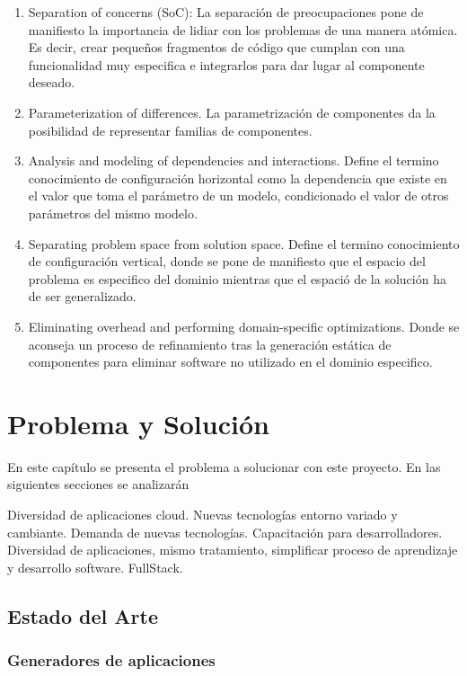 \documentclass[a4paper,11pt]{book}
\begin{document}
\begin{enumerate}
\item Separation of concerns (SoC): La separación de preocupaciones pone de manifiesto la importancia de lidiar con los problemas de una manera atómica. Es decir, crear pequeños fragmentos de código que cumplan con una funcionalidad muy especifica e integrarlos para dar lugar al componente deseado. 
\item Parameterization of differences. La parametrización de componentes da la posibilidad de representar familias de componentes. 
\item Analysis and modeling of dependencies and interactions. Define el termino conocimiento de configuración horizontal como la dependencia que existe en el valor que toma el parámetro de un modelo, condicionado el valor de otros parámetros del mismo modelo.  
\item Separating problem space from solution space. Define el termino conocimiento de configuración vertical, donde se pone de manifiesto que el espacio del problema es especifico del dominio mientras que el espació de la solución ha de ser generalizado.  
\item Eliminating overhead and performing domain-specific optimizations. Donde se aconseja un proceso de refinamiento tras la generación estática de componentes para eliminar software no utilizado en el dominio especifico. 
\end{enumerate}



\chapter{Problema y Solución}

En este capítulo se presenta el problema a solucionar con este proyecto. En las siguientes secciones se analizarán 


Diversidad de aplicaciones cloud. Nuevas tecnologías entorno variado y cambiante. Demanda de nuevas tecnologías.
Capacitación para desarrolladores. Diversidad de aplicaciones, mismo tratamiento, simplificar proceso de aprendizaje y desarrollo software. FullStack. 


\section{Estado del Arte}
\subsection{Generadores de aplicaciones}
\end{document}
